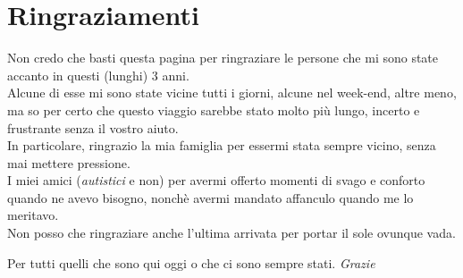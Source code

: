 
\chapter*{Ringraziamenti}

Non credo che basti questa pagina per ringraziare le persone che mi sono state accanto in questi (lunghi) 3 anni.\\
Alcune di esse mi sono state vicine tutti i giorni, alcune nel week-end, altre meno, ma so per certo che questo viaggio sarebbe stato molto più lungo, incerto e frustrante senza il vostro aiuto.
\\

\noindent In particolare, ringrazio la mia famiglia per essermi stata sempre vicino, senza mai mettere pressione.\\
I miei amici (\emph{autistici} e non) per avermi offerto momenti di svago e conforto quando ne avevo bisogno, nonchè avermi mandato affanculo quando me lo meritavo.
\\
Non posso che ringraziare anche l'ultima arrivata per portar il sole ovunque vada.
\\
\vspace{0.3cm}
\begin{center}
Per tutti quelli che sono qui oggi o che ci sono sempre stati. \textit{Grazie}
\end{center}


